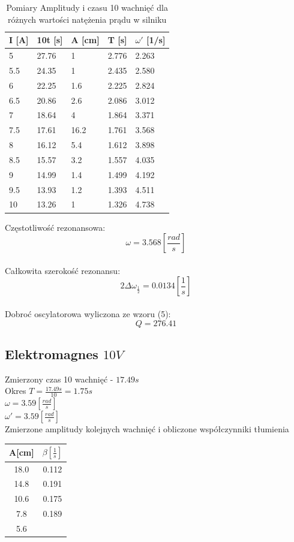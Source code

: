 \documentclass[]{article}
\begin{document}
	\begin{table}[h]
		\centering
		\caption{Pomiary Amplitudy i czasu 10 wachnięć dla różnych wartości natężenia prądu w silniku}
		\begin{tabular}{|l|l|l|l|l|}
			\hline
			
			I [A] & 10t [s] & A [cm] & T [s] & $\omega'$ [1/s] \\ \hline
			5 & 27.76 & 1 & 2.776 & 2.263 \\ \hline
			5.5 & 24.35 & 1 & 2.435 & 2.580 \\ \hline
			6 & 22.25 & 1.6 & 2.225 & 2.824 \\ \hline
			6.5 & 20.86 & 2.6 & 2.086 & 3.012 \\ \hline
			7 & 18.64 & 4 & 1.864 & 3.371 \\ \hline
			7.5 & 17.61 & 16.2 & 1.761 & 3.568 \\ \hline
			8 & 16.12 & 5.4 & 1.612 & 3.898 \\ \hline
			8.5 & 15.57 & 3.2 & 1.557 & 4.035 \\ \hline
			9 & 14.99 & 1.4 & 1.499 & 4.192 \\ \hline
			9.5 & 13.93 & 1.2 & 1.393 & 4.511 \\ \hline
			10 & 13.26 & 1 & 1.326 & 4.738 \\ \hline
			
		\end{tabular}
	\end{table}
	
	Częstotliwość rezonansowa:
	$$\omega = 3.568 \left[ \frac{rad}{s}\right]$$\\
	Całkowita szerokość rezonansu:
	$$2\Delta\omega_{\frac{1}{2}} = 0.0134 \left[ \frac{1}{s}\right] $$\\	
	Dobroć oscylatorowa wyliczona ze wzoru (5):
	$$Q = 276.41$$
	
	
	\subsection{Elektromagnes $10V$}
	Zmierzony czas 10 wachnięć - $17.49s$\\
	Okres $T=\frac{17.49s}{10} = 1.75s$\\
	$\omega = 3.59 \left[ \frac{rad}{s}\right]$\\
	$\omega' = 3.59 \left[ \frac{rad}{s}\right]$\\
	Zmierzone amplitudy kolejnych wachnięć i obliczone współczynniki tłumienia
	\begin{table}[h]
		\begin{tabular}{|c|c|}
			\hline 
			A[cm] & $\beta\left[ \frac{1}{s}\right] $ \\ 
			\hline 
			18.0 & 0.112 \\ 
			\hline 
			14.8 & 0.191 \\ 
			\hline 
			10.6 & 0.175 \\ 
			\hline 
			7.8 & 0.189 \\ 
			\hline 
			5.6 &  \\ 
			\hline 
		\end{tabular} 
	\end{table}
\end{document}
